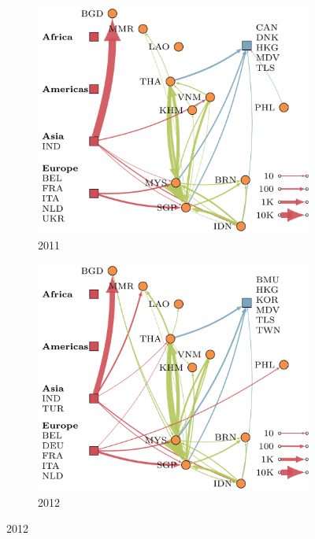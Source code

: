 \documentclass[10pt]{article}
\theoremstyle{definition}
\begin{document}
\begin{figure}[!ht]
    \centering
\begin{subfigure}[b]{.32\textwidth}
    \includegraphics[width=\textwidth]{../international_trade/results/network_plots/sea_2011_tomato.pdf}
    \caption{2011}
\end{subfigure}
\begin{subfigure}[b]{.32\textwidth}
    \includegraphics[width=\textwidth]{../international_trade/results/network_plots/sea_2012_tomato.pdf}
    \caption{2012}

\end{subfigure}
\end{figure}
\end{document}

